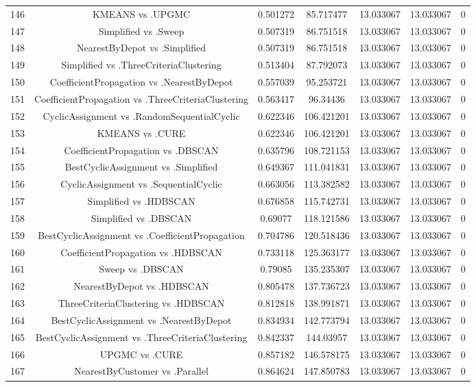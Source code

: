 \documentclass[a4paper,10pt]{article}
\begin{document}
\begin{landscape}
\begin{table}[!htp]
\begin{tabular}{ccccccc}
146&KMEANS vs .UPGMC&0.501272&85.717477&13.033067&13.033067&0\\
147&Simplified vs .Sweep&0.507319&86.751518&13.033067&13.033067&0\\
148&NearestByDepot vs .Simplified&0.507319&86.751518&13.033067&13.033067&0\\
149&Simplified vs .ThreeCriteriaClustering&0.513404&87.792073&13.033067&13.033067&0\\
150&CoefficientPropagation vs .NearestByDepot&0.557039&95.253721&13.033067&13.033067&0\\
151&CoefficientPropagation vs .ThreeCriteriaClustering&0.563417&96.34436&13.033067&13.033067&0\\
152&CyclicAssignment vs .RandomSequentialCyclic&0.622346&106.421201&13.033067&13.033067&0\\
153&KMEANS vs .CURE&0.622346&106.421201&13.033067&13.033067&0\\
154&CoefficientPropagation vs .DBSCAN&0.635796&108.721153&13.033067&13.033067&0\\
155&BestCyclicAssignment vs .Simplified&0.649367&111.041831&13.033067&13.033067&0\\
156&CyclicAssignment vs .SequentialCyclic&0.663056&113.382582&13.033067&13.033067&0\\
157&Simplified vs .HDBSCAN&0.676858&115.742731&13.033067&13.033067&0\\
158&Simplified vs .DBSCAN&0.69077&118.121586&13.033067&13.033067&0\\
159&BestCyclicAssignment vs .CoefficientPropagation&0.704786&120.518436&13.033067&13.033067&0\\
160&CoefficientPropagation vs .HDBSCAN&0.733118&125.363177&13.033067&13.033067&0\\
161&Sweep vs .DBSCAN&0.79085&135.235307&13.033067&13.033067&0\\
162&NearestByDepot vs .HDBSCAN&0.805478&137.736723&13.033067&13.033067&0\\
163&ThreeCriteriaClustering vs .HDBSCAN&0.812818&138.991871&13.033067&13.033067&0\\
164&BestCyclicAssignment vs .NearestByDepot&0.834934&142.773794&13.033067&13.033067&0\\
165&BestCyclicAssignment vs .ThreeCriteriaClustering&0.842337&144.03957&13.033067&13.033067&0\\
166&UPGMC vs .CURE&0.857182&146.578175&13.033067&13.033067&0\\
167&NearestByCustomer vs .Parallel&0.864624&147.850783&13.033067&13.033067&0\\

\end{tabular}
\end{table}
\end{landscape}
\end{document}
